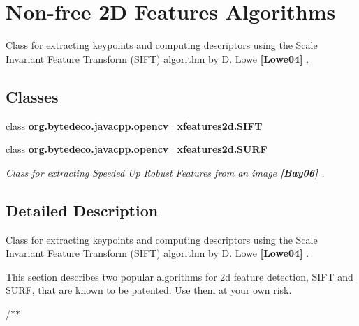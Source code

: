 \hypertarget{group__xfeatures2d__nonfree}{}\section{Non-\/free 2D Features Algorithms}
\label{group__xfeatures2d__nonfree}


Class for extracting keypoints and computing descriptors using the Scale Invariant Feature Transform (S\+I\+FT) algorithm by D. Lowe {\bfseries [Lowe04]} .  


\subsection*{Classes}
\begin{DoxyCompactItemize}
\item 
class {\bfseries org.\+bytedeco.\+javacpp.\+opencv\+\_\+xfeatures2d.\+S\+I\+FT}
\item 
class {\bfseries org.\+bytedeco.\+javacpp.\+opencv\+\_\+xfeatures2d.\+S\+U\+RF}
\begin{DoxyCompactList}\small\item\em Class for extracting Speeded Up Robust Features from an image {\bfseries [Bay06]} . \end{DoxyCompactList}\end{DoxyCompactItemize}


\subsection{Detailed Description}
Class for extracting keypoints and computing descriptors using the Scale Invariant Feature Transform (S\+I\+FT) algorithm by D. Lowe {\bfseries [Lowe04]} . 

This section describes two popular algorithms for 2d feature detection, S\+I\+FT and S\+U\+RF, that are known to be patented. Use them at your own risk. 

/$\ast$$\ast$ 